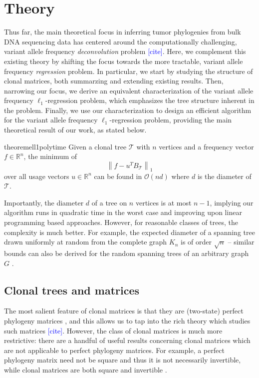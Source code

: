 \documentclass[10pt]{article}
\newcommand{\henri}[1]{\textcolor{blue}{[#1]}}
\newcommand{\tree}{\mathcal{T}}
\begin{document}
\section{Theory}
Thus far, the main theoretical focus in inferring tumor phylogenies from bulk DNA sequencing data 
has centered around the computationally challenging, variant allele frequency \emph{deconvolution} 
problem \henri{cite}. Here, we complement this existing theory by shifting the focus 
towards the more tractable, variant allele frequency \emph{regression} problem. In 
particular, we start by studying the structure of clonal matrices, both summarzing 
and extending existing results. Then, narrowing our focus, we derive an equivalent
characterization of the variant allele frequency $\ell_1$-regression problem, which 
emphasizes the tree structure inherent in the problem. Finally, we use our
characterization to design an efficient algorithm for the variant allele 
frequency $\ell_1$-regression problem, providing the main theoretical result of 
our work, as stated below.
\begin{restatable}{theorem}{ell1polytime}
    Given a clonal tree $\tree$ with $n$ vertices and a frequency vector $f \in \mathbb{R}^n$, the
    minimum of 
    \[\left\lVert f - u^T B_{\tree}\right\rVert_1 \]
    over all usage vectors $u \in \mathbb{R}^n$ can be found in $\mathcal{O}(nd)$ where $d$ is 
    the diameter of $\tree$.
\end{restatable}

Importantly, the diameter $d$ of a tree on $n$ vertices is at most $n - 1$, implying our algorithm 
runs in quadratic time in the worst case and improving upon linear programming based approaches. 
However, for reasonable classes of trees, the complexity is much better. For example, the expected
diameter of a spanning tree drawn uniformly at random from the complete graph $K_n$ is 
of order $\sqrt{n}$ -- similar bounds can also be derived 
for the random spanning trees of an arbitrary graph $G$ \cite{renyi_height_1967, chung_diameter_2012}.

\subsection{Clonal trees and matrices}
\label{sec:clonal-trees-matrices}

The most salient feature of clonal matrices is that they are (two-state) perfect phylogeny matrices 
\cite{el-kebir_reconstruction_2015}, and this allows us to tap into the rich theory 
which studies such matrices \henri{cite}.
However, the class of clonal matrices is much more restrictive:
there are a handful of useful results concerning clonal matrices 
which are not applicable to perfect phylogeny matrices.
For example, a perfect phylogeny matrix need
not be square and thus it is not necessarily invertible, while clonal matrices are both square 
and invertible \cite{el-kebir_reconstruction_2015}. 
\end{document}
